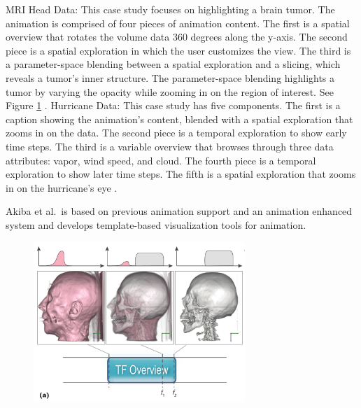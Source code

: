 \documentclass{egpubl}
\begin{document}
MRI Head Data: This case study focuses on highlighting a brain tumor. The animation is comprised of four pieces of animation content. The first is a spatial overview that rotates the volume data 360 degrees along the y-axis. The second piece is a spatial exploration in which the user customizes the view. The third is a parameter-space blending between a spatial exploration and a slicing, which reveals a tumor's inner structure.  The parameter-space blending highlights a tumor by varying the opacity while zooming in on the region of interest. See Figure \ref{fig:AniVis} \cite{Akiba}.
Hurricane Data: This case study  has five components. The first is a caption showing the animation's content, blended with a spatial exploration that zooms in on the data. The second piece is a temporal exploration to show early time steps. The third is a variable overview that browses through three data attributes: vapor, wind speed, and cloud. The fourth piece is a temporal exploration to show later time steps. The fifth is a spatial exploration that zooms in on the hurricane's eye \cite{Akiba}.

Akiba et al.\ is based on previous animation support \cite{childs} and an animation enhanced system \cite{correa} and develops  template-based visualization tools for animation. 

\begin{figure}
\begingroup
\centering
\includegraphics[width=8cm]{./images/AniVis}
\label{fig:AniVis}
\endgroup
\end{figure}
\end{document}
